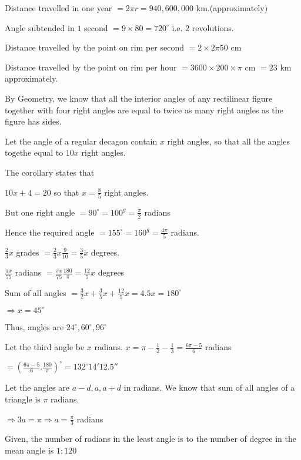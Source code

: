     Distance travelled in one year $= 2\pi r = 940,600,000$ km.(approximately)

\item Angle subtended in $1$ second $= 9\times 80 = 720^\circ$ i.e. $2$ revolutions.

    Distance travelled by the point on rim per second $= 2\times 2\pi 50$ cm

    Distance travelled by the point on rim per hour $= 3600\times 200\times \pi$ cm $= 23$ km approximately.

\item By Geometry, we know that all the interior angles of any rectilinear figure together with four right angles are equal to twice
    as many right angles as the figure has sides.

    Let the angle of a regular decagon contain $x$ right angles, so that all the angles togethe equal to $10x$ right
    angles.

    The corollary states that

    $10 x + 4 = 20$ so that $x = \frac{8}{5}$ right angles.

    But one right angle $= 90^\circ = 100^g = \frac{\pi}{2}$ radians

    Hence the required angle $= 155^\circ= 160^g = \frac{4\pi}{5}$ radians.

\item $\frac{2}{3}x$ grades $= \frac{2}{3}x\frac{9}{10} = \frac{3}{5}x$ degrees.

    $\frac{\pi x}{75}$ radians $= \frac{\pi x}{75}\frac{180}{\pi} = \frac{12}{5}x$ degrees

    Sum of all angles $= \frac{3}{2}x + \frac{3}{5}x + \frac{12}{5}x = 4.5x = 180^\circ$

    $\Rightarrow x = 45^\circ$

    Thus, angles are $24^\circ, 60^\circ, 96^\circ$

\item Let the third angle be $x$ radians. $x = \pi - \frac{1}{2} - \frac{1}{3} = \frac{6\pi - 5}{6}$ radians

    $= \left(\frac{6\pi - 5}{6}. \frac{180}{\pi}\right)^\circ = 132^\circ14'12.5''$

\item Let the angles are $a - d, a, a + d$ in radians. We know that sum of all angles of a triangle is $\pi$ radians.

    $\Rightarrow 3a = \pi \Rightarrow a = \frac{\pi}{3}$ radians

    Given, the number of radians in the least angle is to the number of degree in the mean angle is $1:120$


